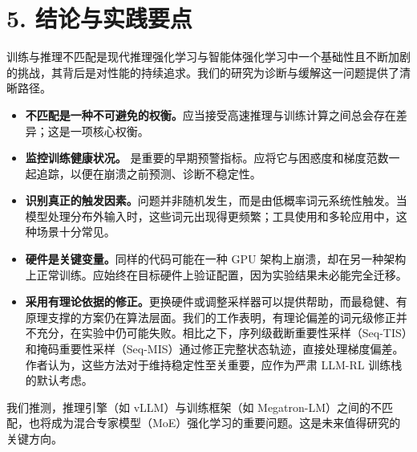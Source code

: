 


\hypertarget{src-271211a5-58b7-807d-aec4-ddd7af54a0b0}{}
\section*{5. 结论与实践要点}
{}



训练与推理不匹配是现代推理强化学习与智能体强化学习中一个基础性且不断加剧的挑战，其背后是对性能的持续追求。我们的研究为诊断与缓解这一问题提供了清晰路径。



\begin{itemize}

\item \textbf{不匹配是一种不可避免的权衡。}应当接受高速推理与训练计算之间总会存在差异；这是一项核心权衡。


\item \textbf{监控训练健康状况。} 是重要的早期预警指标。应将它与困惑度和梯度范数一起追踪，以便在崩溃之前预测、诊断不稳定性。


\item \textbf{识别真正的触发因素。}问题并非随机发生，而是由低概率词元系统性触发。当模型处理分布外输入时，这些词元出现得更频繁；工具使用和多轮应用中，这种场景十分常见。


\item \textbf{硬件是关键变量。}同样的代码可能在一种 GPU 架构上崩溃，却在另一种架构上正常训练。应始终在目标硬件上验证配置，因为实验结果未必能完全迁移。


\item \textbf{采用有理论依据的修正。}更换硬件或调整采样器可以提供帮助，而最稳健、有原理支撑的方案仍在算法层面。我们的工作表明，有理论偏差的词元级修正并不充分，在实验中仍可能失败。相比之下，序列级截断重要性采样（Seq-TIS）和掩码重要性采样（Seq-MIS）通过修正完整状态轨迹，直接处理梯度偏差。作者认为，这些方法对于维持稳定性至关重要，应作为严肃 LLM-RL 训练栈的默认考虑。

\end{itemize}


我们推测，推理引擎（如 vLLM）与训练框架（如 Megatron-LM）之间的不匹配，也将成为混合专家模型（MoE）强化学习的重要问题。这是未来值得研究的关键方向。


